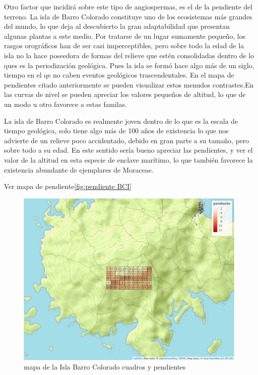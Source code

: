 \documentclass[11pt,]{article}
\begin{document}
Otro factor que incidirá sobre este tipo de angiospermas, es el de la
pendiente del terreno. La isla de Barro Colorado constituye uno de los
ecosistemas más grandes del mundo, lo que deja al descubierto la gran
adaptabilidad que presentan algunas plantas a este medio. Por tratarse
de un lugar sumamente pequeño, los rasgos orográficos han de ser casi
imperceptibles, pero sobre todo la edad de la isla no la hace poseedora
de formas del relieve que estén consolidadas dentro de lo ques es la
periodización geológica. Pues la isla se formó hace algo más de un
siglo, tiempo en el qe no caben eventos geológicos trascendentales. En
el mapa de pendientes citado anteriormente se pueden visualizar estos
menudos contrastes.En las curvas de nivel se pueden apreciar los valores
pequeños de altitud, lo que de un modo u otro favorece a estas familas.

La isla de Barro Colorado es realmente joven dentro de lo que es la
escala de tiempo geológica, solo tiene algo más de 100 años de
existencia lo que nos advierte de un relieve poco accidentado, debido en
gran parte a su tamaño, pero sobre todo a su edad. En este sentido sería
bueno apreciar las pendientes, y ver el valor de la altitud en esta
especie de enclave marítimo, lo que también favorece la existencia
abundante de ejemplares de Moraceae.

Ver mapa de pendiente\ref{fig:pendiente BCI}

\begin{figure}
\centering
\includegraphics[width=1.00000\textwidth]{mapa_cuadros_pendiente.png}
\caption{mapa de la Isla Barro Colorado cuadros y pendientes
\label{fig:bci_map}}
\end{figure}
\end{document}
